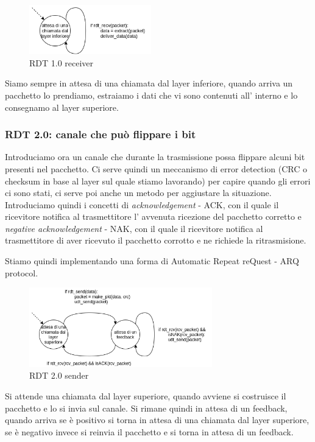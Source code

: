 \begin{figure}[H]
    \centering
    \includegraphics[width=200px]{images/3_Reti_connessione_diretta/rdt_1.0_receiver.png}
    \caption{RDT 1.0 receiver}
\end{figure}
Siamo sempre in attesa di una chiamata dal layer inferiore, quando arriva un pacchetto lo prendiamo, estraiamo i dati che vi sono contenuti all' interno e lo consegnamo al layer superiore.


\subsubsection{RDT 2.0: canale che può flippare i bit}
Introduciamo ora un canale che durante la trasmissione possa flippare alcuni bit presenti nel pacchetto.
Ci serve quindi un meccanismo di error detection (CRC o checksum in base al layer sul quale stiamo lavorando) per capire quando gli errori ci sono stati, ci serve poi anche un metodo per aggiustare la situazione.
Introduciamo quindi i concetti di \emph{acknowledgement} - ACK, con il quale il ricevitore notifica al trasmettitore l' avvenuta ricezione del pacchetto corretto e \emph{negative acknowledgement} - NAK, con il quale il ricevitore notifica al trasmettitore di aver ricevuto il pacchetto corrotto e ne richiede la ritrasmisione.

Stiamo quindi implementando una forma di Automatic Repeat reQuest - ARQ protocol.

\begin{figure}[H]
    \centering
    \includegraphics[width=300px]{images/3_Reti_connessione_diretta/rdt_2.0_sender.png}
    \caption{RDT 2.0 sender}
\end{figure}
Si attende una chiamata dal layer superiore, quando avviene si costruisce il pacchetto e lo si invia sul canale.
Si rimane quindi in attesa di un feedback, quando arriva se è positivo si torna in attesa di una chiamata dal layer superiore, se è negativo invece si reinvia il pacchetto e si torna in attesa di un feedback.

